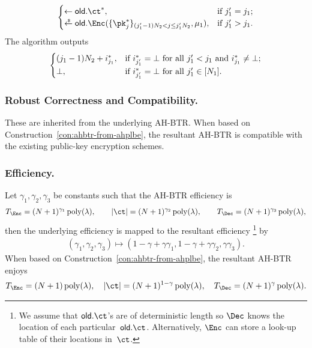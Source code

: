 \begin{construction}
\begin{itemize}
\begin{align*}
\begin{cases}
\gets\OLD.\ct^\ast,&\textup{if }j_1'=j_1;\\
\draws\OLD.\Enc(\{\pk^\ast_j\}_{(j_1'-1)N_2<j\leq j_1'N_2},\mu_1),&
\textup{if }j_1'>j_1.
\end{cases}
\end{align*}
The algorithm outputs
\begin{align*}
\begin{cases}
(j_1-1)N_2+i^\ast_{j_1},&\textup{if }
i^\ast_{j_1'}=\bot\textup{ for all }j_1'<j_1
\textup{ and }
i^\ast_{j_1}\neq\bot;\\
\bot,&\textup{if }i^\ast_{j_1'}=\bot\textup{ for all }j_1'\in[N_1].
\end{cases}
\end{align*}
\end{itemize}
\end{construction}

\subsubsection{Robust Correctness and Compatibility.}
These are inherited from the underlying AH-BTR\@.
When based on Construction~\ref{con:ahbtr-from-ahplbe},
the resultant AH-BTR is compatible with the existing public-key encryption schemes.

\subsubsection{Efficiency.}
Let $\gamma_1,\gamma_2,\gamma_3$ be constants such that the AH-BTR efficiency is
\begin{align*}
T_\Enc=(N+1)^{\gamma_1}\poly(\lambda),\qquad
|\ct|=(N+1)^{\gamma_2}\poly(\lambda),\qquad
T_\Dec=(N+1)^{\gamma_3}\poly(\lambda),
\end{align*}
then the underlying efficiency is mapped to the resultant efficiency%
\footnote{We assume that $\OLD.\ct$'s are of deterministic length
so $\Dec$ knows the location of each particular~$\OLD.\ct$.
Alternatively, $\Enc$ can store a look-up table of their locations in~$\ct$.}
by
\begin{align*}
(\gamma_1,\gamma_2,\gamma_3)\mapsto
(1-\gamma+\gamma\gamma_1,1-\gamma+\gamma\gamma_2,\gamma\gamma_3).
\end{align*}
When based on Construction~\ref{con:ahbtr-from-ahplbe},
the resultant AH-BTR enjoys
\begin{align*}
T_\Enc=(N+1)\poly(\lambda),\quad
|\ct|=(N+1)^{1-\gamma}\poly(\lambda),\quad
T_\Dec=(N+1)^\gamma\poly(\lambda).
\end{align*}
